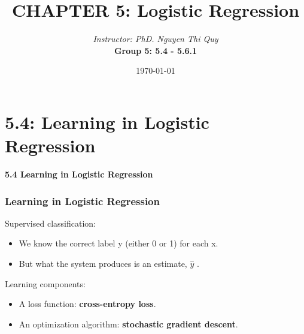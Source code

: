 \documentclass[13.5pt,aspecratio=169]{beamer}
\title{CHAPTER 5: Logistic Regression}
\author[Group 5]{\textit{Instructor: PhD. Nguyen Thi Quy}\\ \bigskip \textbf{Group 5: 5.4 - 5.6.1}}
\date{\today}
\begin{document}
\maketitle


\section{5.4: Learning in Logistic Regression}

\begin{frame}
    \bigskip
    \color{blue} \Huge \textbf{5.4 Learning in Logistic Regression} 
\end{frame}

\begin{frame}
    \frametitle{{Learning in Logistic Regression}}
     {\begin{block}{Supervised classification:}
        \begin{itemize}
            \item We know the correct label \color{blue} y \color{black} (either 0 or 1) for each x. 
            \item But what the system produces is an estimate, \color{blue} $\hat{y}$ \color{black} .
        \end{itemize}
    \end{block}}
    \bigskip
     {
        \begin{block}{\Large Learning components:}
            \begin{itemize}
                \item A loss function: \textbf{cross-entropy loss}.
                \item An optimization algorithm: \textbf{stochastic gradient descent}.
            \end{itemize}
        \end{block}
    }
\end{frame}
\end{document}
